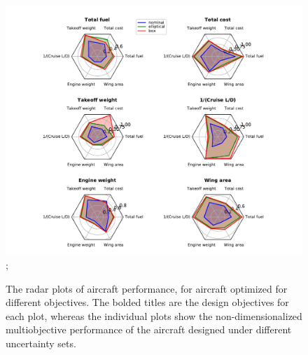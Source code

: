 \begin{figure}[!ht]
\begin{center}
\includegraphics[trim={2cm 0cm 1cm 0cm},clip,scale=0.75]{6objradar.pdf};
\caption{The radar plots of aircraft performance, for aircraft optimized for different objectives.
The bolded titles are the design objectives for each plot, whereas the individual plots
show the non-dimensionalized multiobjective performance of the aircraft designed under different
uncertainty sets. }
\label{fig:radar}
\end{center}
\end{figure}

